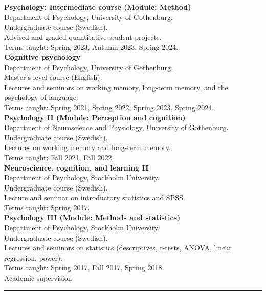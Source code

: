 \documentclass[10pt]{article}
\newcommand{\RR}{\textcolor{grayrule}{\rule[3mm]{\textwidth}{0.5pt}}}
\newcommand{\oneline}{\\[1\baselineskip]}
\begin{document}
\textbf{Psychology: Intermediate course (Module: Method)} \\
Department of Psychology, University of Gothenburg. \\
Undergraduate course (Swedish). \\Advised and graded quantitative student projects. \\Terms taught: Spring 2023, Autumn 2023, Spring 2024.  \oneline
\textbf{Cognitive psychology} \\
Department of Psychology, University of Gothenburg. \\
Master's level course (English). \\Lectures and seminars on working memory, long-term memory, and the psychology of language. \\
Terms taught: Spring 2021, Spring 2022, Spring 2023, Spring 2024.  \oneline
\textbf{Psychology II (Module: Perception and cognition)} \\
Department of Neuroscience and Physiology, University of Gothenburg. \\
Undergraduate course (Swedish). \\ Lectures on working memory and long-term memory.\\
Terms taught: Fall 2021, Fall 2022. \oneline
\textbf{Neuroscience, cognition, and learning II} \\
Department of Psychology, Stockholm University.\\
Undergraduate course (Swedish). \\Lecture and seminar on introductory statistics and SPSS.\\
Terms taught: Spring 2017.\oneline
\textbf{Psychology III (Module: Methods and statistics)} \\
Department of Psychology, Stockholm University. \\
Undergraduate course (Swedish). \\ Lectures and seminars on statistics (descriptives, t-tests, ANOVA, linear regression, power). \\
Terms taught: Spring 2017, Fall 2017, Spring 2018. \\


{\large Academic supervision} \\
\vspace{-.3cm}\RR 
\end{document}
